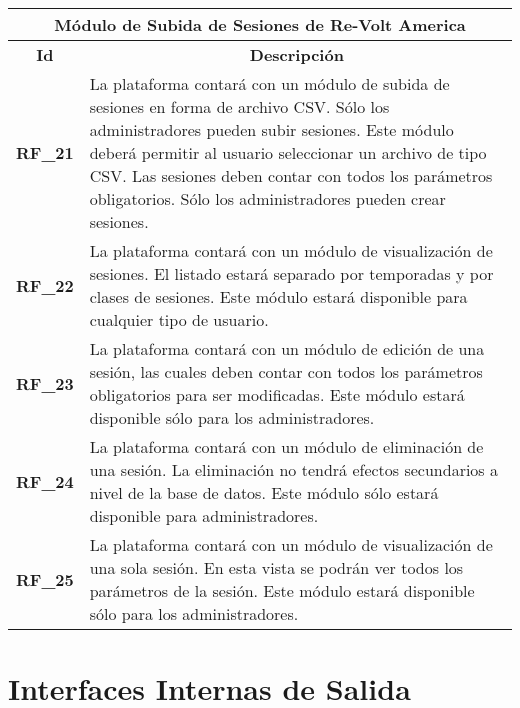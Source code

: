 \begin{center}
	\begin{tabular}{ | l | p{15cm} |}
		\hline
		\multicolumn{2}{|c|}{\textbf{Módulo de Subida de Sesiones de Re-Volt America}} \\
		\hline
		\multicolumn{1}{|c|}{\textbf{Id}} & \multicolumn{1}{|c|}{\textbf{Descripción}} \\
		\hline
		{\textbf{RF\_21}} & La plataforma contará con un módulo de subida de sesiones en forma de archivo CSV. Sólo los administradores pueden subir sesiones. Este módulo deberá permitir al usuario seleccionar un archivo de tipo CSV. Las sesiones deben contar con todos los parámetros obligatorios. Sólo los administradores pueden crear sesiones. \\ \hline
		
		{\textbf{RF\_22}} & La plataforma contará con un módulo de visualización de sesiones. El listado estará separado por temporadas y por clases de sesiones. Este módulo estará disponible para cualquier tipo de usuario. \\ \hline
		
		{\textbf{RF\_23}} & La plataforma contará con un módulo de edición de una sesión, las cuales deben contar con todos los parámetros obligatorios para ser modificadas. Este módulo estará disponible sólo para los administradores. \\ \hline
		
		{\textbf{RF\_24}} & La plataforma contará con un módulo de eliminación de una sesión. La eliminación no tendrá efectos secundarios a nivel de la base de datos. Este módulo sólo estará disponible para administradores. \\ \hline
		
		{\textbf{RF\_25}} & La plataforma contará con un módulo de visualización de una sola sesión. En esta vista se podrán ver todos los parámetros de la sesión. Este módulo estará disponible sólo para los administradores. \\ \hline
	\end{tabular}
\end{center}

\section{Interfaces Internas de Salida}

